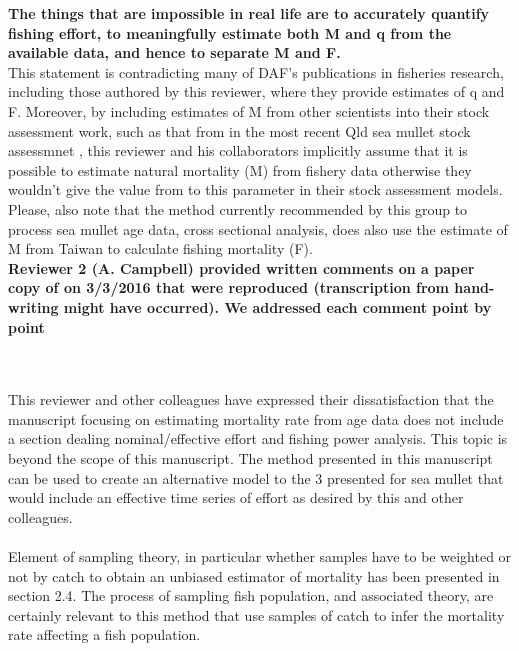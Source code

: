 \documentclass[11pt]{article}
\begin{document}
\begin{spacing}{1.2}
{\bf The things that are impossible in real life are to accurately quantify fishing effort, to meaningfully estimate both M and q from the available data, and hence to separate M and F.} \\
This statement is contradicting many of DAF's publications in fisheries research, including those authored by this reviewer, where they provide estimates of q and F. Moreover, by including estimates of M from other scientists into their stock assessment work, such as that from \cite{Hwang82a} in the most recent Qld sea mullet stock assessmnet \citep{Bell2005r}, this reviewer and his collaborators implicitly assume that it is possible to estimate natural mortality (M) from fishery data otherwise they wouldn't give the value from \cite{Hwang82a} to this parameter in their stock assessment models. Please, also note that the method currently recommended by this group to process sea mullet age data, cross sectional analysis, does also use the estimate of M from Taiwan \citep{Hwang82a} to calculate fishing mortality (F).\\


{\bf Reviewer 2 (A. Campbell) provided written comments on a paper copy of \citep{Kienzle2015} on 3/3/2016 that were reproduced (transcription from hand-writing might have occurred). We addressed each comment point by point}\\

 \\
\vspace{3cm}

 \\
This reviewer and other colleagues have expressed their dissatisfaction that the manuscript focusing on estimating mortality rate from age data does not include a section dealing nominal/effective effort and fishing power analysis. This topic is beyond the scope of this manuscript. The method presented in this manuscript can be used to create an alternative model to the 3 presented for sea mullet that would include an effective time series of effort as desired by this and other colleagues. \\

 \\
Element of sampling theory, in particular whether samples have to be weighted or not by catch to obtain an unbiased estimator of mortality has been presented in section 2.4. The process of sampling fish population, and associated theory, are certainly relevant to this method that use samples of catch to infer the mortality rate affecting a fish population. \\


\end{spacing}
\end{document}
